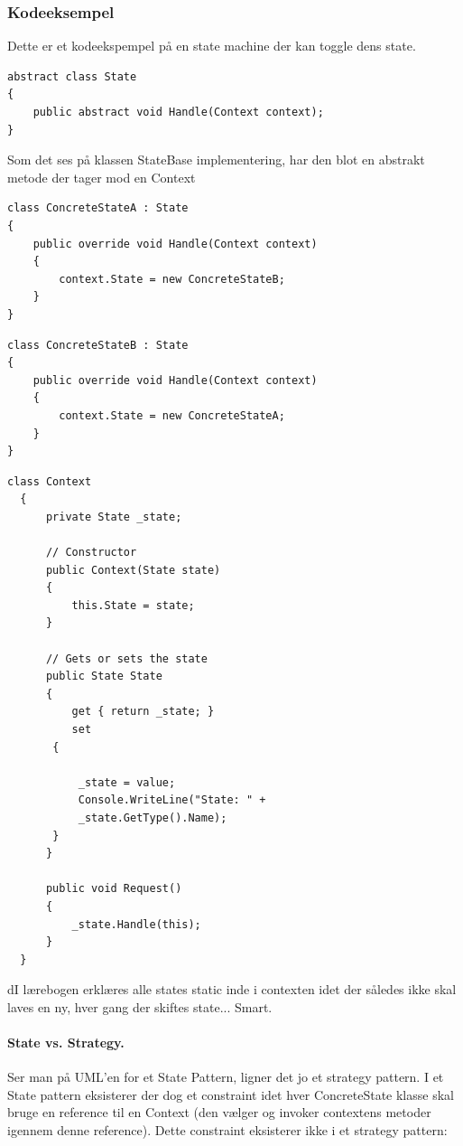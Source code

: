 \subsubsection{Kodeeksempel}

Dette er et kodeekspempel på en state machine der kan toggle dens state.

\begin{lstlisting}[caption=StateBase klassen]
abstract class State
{
	public abstract void Handle(Context context);
}
\end{lstlisting}

Som det ses på klassen StateBase implementering, har den blot en abstrakt metode der tager mod en Context

\begin{lstlisting}[caption=ConcreteStateA klassen - Switcher til State B]
class ConcreteStateA : State
{
	public override void Handle(Context context)
	{
		context.State = new ConcreteStateB;
	}
}
\end{lstlisting}

\begin{lstlisting}[caption=StateBase klassen - Switcher til state A]
class ConcreteStateB : State
{
	public override void Handle(Context context)
	{
		context.State = new ConcreteStateA;
	}
}
\end{lstlisting}


\begin{lstlisting}[caption=Context klassen - Bruges i main() til at kalde Request()]
  class Context
  {
	  private State _state;
  
	  // Constructor
	  public Context(State state)
	  {
		  this.State = state;
	  }
  
	  // Gets or sets the state
	  public State State
	  {
		  get { return _state; }
		  set
	   {
	  
		   _state = value;
		   Console.WriteLine("State: " +
		   _state.GetType().Name);
	   }
	  }
  
	  public void Request()
	  {
		  _state.Handle(this);
	  }
  }
\end{lstlisting}
\newpage

dI lærebogen erklæres alle states static inde i contexten idet der således ikke skal laves en ny, hver gang der skiftes state... Smart.

\paragraph{State vs. Strategy.}
Ser man på UML'en for et State Pattern, ligner det jo et strategy pattern. I et State  pattern eksisterer der dog et constraint idet hver ConcreteState klasse skal bruge en reference til en Context (den vælger og invoker contextens metoder igennem denne reference). Dette constraint eksisterer ikke i et strategy pattern:

